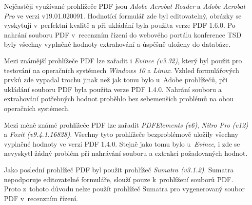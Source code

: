 \par
Nejčastěji využívané prohlížeče PDF jsou \textit{Adobe Acrobat Reader} a \textit{Adobe Acrobat Pro} ve verzi v19.01.020091. Hodnotící formulář zde byl editovatelný, obrázky se vyskytují v~perfektní kvalitě a při ukládání byla použita verze PDF 1.6.0. Po nahrání souboru PDF v~recenzním řízení do webového portálu konference TSD byly všechny vyplněné hodnoty extrahování a úspěšně uloženy do databáze.
\par
Mezi známější prohlížeče PDF lze zařadit i \textit{Evince (v3.32)}, který byl použit pro testování na operačních systémech \textit{Windows 10} a \textit{Linux}. Vzhled formulářových prvků zde vypadal trochu jinak než jak tomu bylo u~Adobe prohlížečů, při ukládání souboru PDF byla použita verze PDF 1.4.0. Nahrání souboru a extrahování potřebných hodnot proběhlo bez sebemenších problémů na obou operačních systémech.
\par
Mezi méně známé prohlížeče PDF lze zařadit \textit{PDFElements (v6)}, \textit{Nitro Pro (v12)} a \textit{Foxit (v9.4.1.16828)}. Všechny tyto prohlížeče bezproblémově uložily všechny vyplněné hodnoty ve verzi PDF 1.4.0. Stejně jako tomu bylo u~\textit{Evince}, i zde se nevyskytl žádný problém při nahrávání souboru a extrakci požadovaných hodnot.
\par
Jako poslední prohlížeč PDF byl použit prohlížeč \textit{Sumatra (v3.1.2)}. Sumatra nepodporuje editovatelné formuláře, slouží pouze k~prohlížení souborů PDF. Proto z~tohoto důvodu nelze použít prohlížeč Sumatra pro vygenerovaný soubor PDF v~recenzním řízení.

